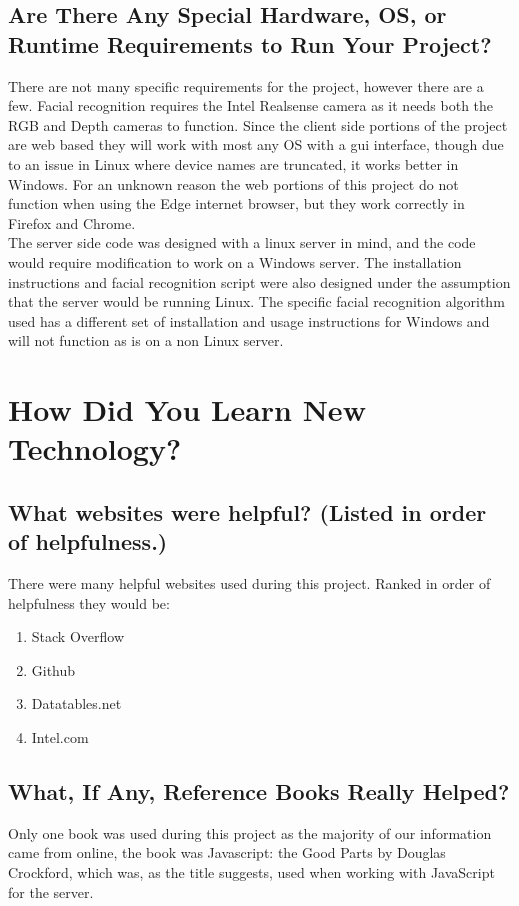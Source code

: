 \documentclass[10pt, onecolumn, twoside, peerreview]{IEEEtran}
\begin{document}
\subsection{Are There Any Special Hardware, OS, or Runtime Requirements to Run Your Project?}
There are not many specific requirements for the project, however there are a few. Facial recognition requires the Intel Realsense camera as it needs both the RGB and Depth cameras to function. Since the client side portions of the project are web based they will work with most any OS with a gui interface, though due to an issue in Linux where device names are truncated, it works better in Windows. For an unknown reason the web portions of this project do not function when using the Edge internet browser, but they work correctly in Firefox and Chrome.\\

The server side code was designed with a linux server in mind, and the code would require modification to work on a Windows server. The installation instructions and facial recognition script were also designed under the assumption that the server would be running Linux. The specific facial recognition algorithm used has a different set of installation and usage instructions for Windows and will not function as is on a non Linux server. 

\section{How Did You Learn New Technology?}
\subsection{What websites were helpful? (Listed in order of helpfulness.)}
There were many helpful websites used during this project. Ranked in order of helpfulness they would be:
\begin{enumerate}
  \item Stack Overflow
  \item Github
  \item Datatables.net
  \item Intel.com
\end{enumerate}

\subsection{What, If Any, Reference Books Really Helped?}
Only one book was used during this project as the majority of our information came from online, the book was Javascript: the Good Parts by Douglas Crockford, which was, as the title suggests, used when working with JavaScript for the server.
\end{document}
